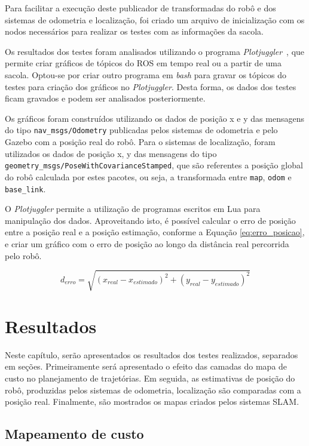 \documentclass[repeatfields,xlists,xpacks,oneside,yearsonly]{ufrgscca}
\begin{document}
Para facilitar a execução deste publicador de transformadas do robô e
dos sistemas de odometria e localização, foi criado um arquivo de
inicialização com os nodos necessários para realizar os testes com as
informações da sacola.

Os resultados dos testes foram analisados utilizando o programa
\textit{Plotjuggler}~\cite{plotjuggler}, que permite criar gráficos
de tópicos do ROS em tempo real ou a partir de uma sacola. Optou-se
por criar outro programa em \textit{bash} para gravar os tópicos do
testes para criação dos gráficos no \textit{Plotjuggler}. Desta
forma, os dados dos testes ficam gravados e podem ser analisados
posteriormente.

Os gráficos foram construídos utilizando os dados de posição x e y
das mensagens do tipo \texttt{nav\_msgs/Odometry} publicadas pelos
sistemas de odometria e pelo Gazebo com a posição real do robô. Para
o sistemas de localização, foram utilizados os dados de posição x, y
das mensagens do tipo
\texttt{geometry\_msgs/PoseWithCovarianceStamped}, que são referentes
a posição global do robô calculada por estes pacotes, ou seja, a
transformada entre \texttt{map}, \texttt{odom} e \texttt{base\_link}.

O \textit{Plotjuggler} permite a utilização de programas escritos em
Lua para manipulação dos dados. Aproveitando isto, é possível
calcular o erro de posição entre a posição real e a posição
estimação, conforme a Equação \ref{eq:erro_posicao}, e criar um
gráfico com o erro de posição ao longo da distância real percorrida
pelo robô.

\begin{equation}
    \label{eq:erro_posicao}
    d_{erro} = \sqrt{(x_{real} - x_{estimado})^2 + (y_{real} - y_{estimado})^2}
\end{equation}

\chapter{Resultados}
\label{resultados}

Neste capítulo, serão apresentados os resultados dos testes
realizados, separados em seções. Primeiramente será apresentado o
efeito das camadas do mapa de custo no planejamento de trajetórias.
Em seguida, as estimativas de posição do robô, produzidas pelos
sistemas de odometria, localização são comparadas com a posição real.
Finalmente, são mostrados os mapas criados pelos sistemas SLAM.

\section{Mapeamento de custo}
\end{document}
